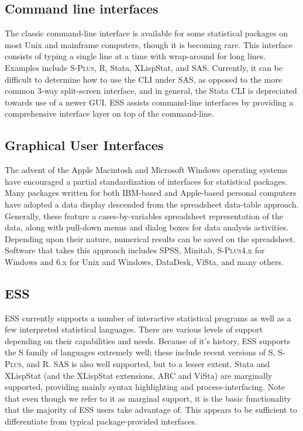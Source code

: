 \documentclass{article}
\newcommand*{\Splus}{\textsc{S-Plus}}
\begin{document}
\subsection{Command line interfaces}
\label{sec:UI:command}

The classic command-line interface is available for some statistical
packages on most Unix and mainframe computers, though it is becoming
rare.  This interface consists of typing a single line at a time with
wrap-around for long lines.  Examples include \Splus, R, Stata,
XLispStat, and SAS.  Currently, it can be difficult to determine how
to use the CLI under SAS, as opposed to the more common 3-way
split-screen interface, and in general, the Stata CLI is depreciated
towards use of a newer GUI.  ESS assists command-line interfaces by
providing a comprehensive interface layer on top of the command-line.

\subsection{Graphical User Interfaces}
\label{sec:UI:GUI}

The advent of the Apple Macintosh and Microsoft Windows operating
systems have encouraged a partial standardization of interfaces for
statistical packages.  Many packages written for both IBM-based and
Apple-based personal computers have adopted a data display 
descended from the spreadsheet
data-table approach.  Generally, these feature a cases-by-variables
spreadsheet representation of the data, along with pull-down menus and
dialog boxes for data analysis activities.  Depending upon their
nature, numerical results can be saved on the spreadsheet.  Software
that takes this approach includes SPSS, Minitab, \Splus 4.x for Windows and 6.x for Unix and Windows,
DataDesk, ViSta, and many others.

\subsection{ESS}
\label{sec:UI:ESS}

ESS currently supports a number of interactive statistical programs as
well as a few interpreted statistical languages. There are various
levels of support depending on their capabilities and needs.  Because
of it's history, ESS supports the S family of languages extremely
well; these include recent versions of S, \Splus, and R.  SAS is also
well supported, but to a lesser extent.  Stata and XLispStat (and the
XLispStat extensions, ARC and ViSta) are marginally supported,
providing mainly syntax highlighting and process-interfacing.  Note
that even though we refer to it as marginal support, it is the basic
functionality that the majority of ESS users take advantage of.  This
appears to be sufficient to differentiate from typical
package-provided interfaces.
\end{document}
